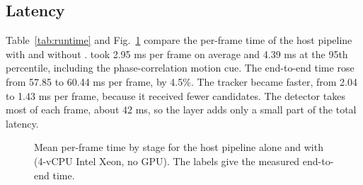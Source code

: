 

\subsection{Latency}\label{sec:latency}
Table~\ref{tab:runtime} and Fig.~\ref{fig:runtime} compare the per-frame time
of the host pipeline with and without \scl{}. \scl{} took 2.95 ms per
frame on average and 4.39 ms at the 95th percentile, including the
phase-correlation motion cue. The end-to-end time rose from 57.85 to 60.44 ms
per frame, by 4.5\%. The tracker became faster, from 2.04 to 1.43 ms per
frame, because it received fewer candidates. The detector takes most of each
frame, about 42 ms, so the layer adds only a small part of the total latency.



\begin{figure}[t]
\centering

\caption{Mean per-frame time by stage for the host pipeline alone and with
\scl{} (4-vCPU Intel Xeon, no GPU). The labels give the measured
end-to-end time.}
\label{fig:runtime}
\end{figure}
